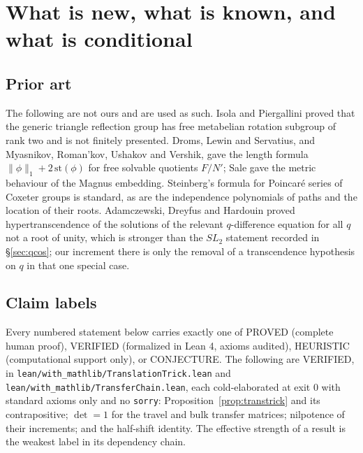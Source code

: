 \documentclass[11pt]{article}
\theoremstyle{definition}
\theoremstyle{remark}
\theoremstyle{definition}
\newcommand{\Z}{\mathbb{Z}}
\newcommand{\R}{\mathbb{R}}
\newcommand{\Isom}{\operatorname{Isom}}
\begin{document}
\begin{abstract}
Sections~\ref{sec:masterC} and \ref{sec:faithful} settle the three-dimensional case. The
conjecture that the orthoscheme representation is faithful at every Class C rational leg tuple is
false, with explicit counterexamples, the shortest kernel element found having length $76$. On the
other hand the tuple $(1,2,11)$ is faithful, proved by identifying $W_3$ as
$F_2\rtimes(\Z/2\times\Z/2)$ and recognising the image of the free factor as the classical
free group of rotations by $\arccos(3/5)$ about perpendicular axes. Consequently, in dimension
three, $\bigcap_a\ker\rho_a$ is trivial, the generic growth series is the rational envelope in
every degree, $W_3$ embeds in $\Isom(\R^3)$, and the generic $3$-orthoscheme group is finitely
presented.
\end{abstract}

\section{What is new, what is known, and what is conditional}\label{sec:status}

\subsection{Prior art}
The following are not ours and are used as such. Isola and Piergallini proved that the generic
triangle reflection group has free metabelian rotation subgroup of rank two and is not finitely
presented. Droms, Lewin and Servatius, and Myasnikov, Roman'kov, Ushakov and Vershik, gave the
length formula $\|\phi\|_1+2\,\mathrm{st}(\phi)$ for free solvable quotients $F/N'$; Sale gave
the metric behaviour of the Magnus embedding. Steinberg's formula for Poincar\'e series of
Coxeter groups is standard, as are the independence polynomials of paths and the location of
their roots. Adamczewski, Dreyfus and Hardouin proved hypertranscendence of the solutions of the
relevant $q$-difference equation for all $q$ not a root of unity, which is stronger than the
$SL_2$ statement recorded in \S\ref{sec:qcos}; our increment there is only the removal of a
transcendence hypothesis on $q$ in that one special case.

\subsection{Claim labels}
Every numbered statement below carries exactly one of PROVED (complete human proof),
VERIFIED (formalized in Lean 4, axioms audited), HEURISTIC (computational support only), or
CONJECTURE. The following are VERIFIED, in
\texttt{lean/with\_mathlib/TranslationTrick.lean} and
\texttt{lean/with\_mathlib/TransferChain.lean}, each cold-elaborated at exit $0$ with standard
axioms only and no \texttt{sorry}: Proposition~\ref{prop:transtrick} and its contrapositive;
$\det=1$ for the travel and bulk transfer matrices; nilpotence of their increments; and the
half-shift identity. The effective strength of a result is the weakest label in its dependency chain.
\end{document}
